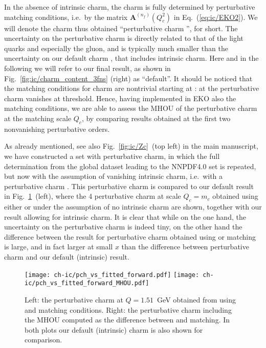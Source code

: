 
In the absence of intrinsic charm, the charm \pdf is fully determined by
perturbative matching conditions, i.e.\ by the matrix
$\mathbf{A}^{(n_f)}(Q_{c}^2)$ in Eq.~(\ref{eq:ic/EKO2}).
%
We will denote the
charm \pdf thus obtained
``perturbative charm \pdf'', for short. The \pdf
uncertainty on the perturbative charm \pdf is directly related to that 
of the light quarks and especially the gluon, and is typically much smaller
than  the  uncertainty on our default charm \pdf, that includes
intrinsic charm. Here and in the following we will refer to our final
result, as shown in Fig.~\ref{fig:ic/charm_content_3fns} (right) as ``default''.
%
It should be noticed that the matching conditions for charm are 
nontrivial starting
at \nnlo: at \nlo the perturbative charm \pdf vanishes at threshold.
%
Hence, having implemented in EKO also the \nnnlo matching conditions,
we are able to assess the MHOU of the perturbative charm at the
matching scale $Q_c$, by comparing
results obtained at the first two nonvanishing perturbative
orders.

As already mentioned, see also Fig.~\ref{fig:ic/Zc}~(top left) in the main manuscript, we have
constructed a \pdf set with perturbative charm, in which the full \pdf
determination from the global dataset leading to the NNPDF4.0 \pdf set
is repeated, but now with the assumption of vanishing intrinsic charm,
i.e.\ with a perturbative charm \pdf.
%
This perturbative charm \pdf is compared to our default result
in Fig.~\ref{fig:ic/charm_fitted_vs_perturbative_mhous}~(left), where the 4\fns
perturbative 
charm \pdf at scale  $Q_c=m_c$ obtained using either \nnlo or \nnnlo
under the assumption of no intrinsic charm are shown, together with
our  result allowing for intrinsic charm.
%
It is clear that while on the one hand, the \pdf uncertainty on the
perturbative charm \pdf is indeed tiny, on the other
hand the difference between the result for perturbative charm
obtained using \nnlo or \nnnlo matching is large, and in
fact larger at small $x$ than the difference between perturbative charm and our
default (intrinsic) result.

\begin{figure}[h]
  \begin{center}
    \texttt{[image: ch-ic/pch\_vs\_fitted\_forward.pdf]}
    \texttt{[image: ch-ic/pch\_vs\_fitted\_forward\_MHOU.pdf]}
    \caption{\small Left: the perturbative charm \pdf at $Q=1.51$~GeV
  obtained from \nnlo \pdfs using \nnlo and \nnnlo matching
    conditions.
      Right: the \nnlo perturbative charm \pdf including the MHOU
    computed as the difference between \nnlo and \nnnlo matching.
In both plots our default (intrinsic) charm \pdf is also shown for comparison.  
  \label{fig:ic/charm_fitted_vs_perturbative_mhous} }
\end{center}
\end{figure}

